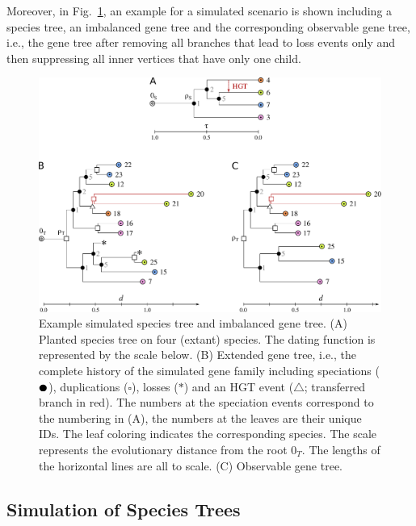 \documentclass[hidelinks,11pt]{scrreprt}
\newcommand{\SPEC}{\newmoon}
\newcommand{\HGT}{\triangle}
\newcommand{\DUPL}{\square}
\begin{document}
Moreover, in Fig.~\ref{fig:simulated_trees}, an example for a simulated scenario is shown including a species tree, an imbalanced gene tree and the corresponding observable gene tree, i.e., the gene tree after removing all branches that lead to loss events only and then suppressing all inner vertices that have only one child.

\vspace{5mm}
\begin{figure}[ht]
	\begin{center}     
		\includegraphics[width=\columnwidth]{simulated_trees.pdf}
	\end{center}
	\caption[Example simulated species tree and imbalanced gene tree]{Example simulated species tree and imbalanced gene tree. (A) Planted species tree on four (extant) species. The dating function is represented by the scale below. (B) Extended gene tree, i.e., the complete history of the simulated gene family including speciations ($\SPEC$), duplications ($\DUPL$), losses ($*$)  and an HGT event ($\HGT$; transferred branch in red). The numbers at the speciation events correspond to the numbering in (A), the numbers at the leaves are their unique IDs. The leaf coloring indicates the corresponding species. The scale represents the evolutionary distance from the root $0_T$. The lengths of the horizontal lines are all to scale. (C) Observable gene tree.}
	\label{fig:simulated_trees}
\end{figure}

\subsection{Simulation of Species Trees}
\label{sec:species_tree}
\end{document}
